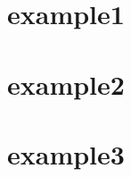 \documentclass{book}%
\begin{document}
\pagestyle{plain}

\chapter{example1}


\chapter{example2}


\chapter{example3}

\end{document}
